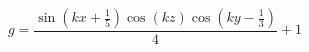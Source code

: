 $$
g = \frac{\sin{\left(k x + \frac{1}{5} \right)} \cos{\left(k z \right)} \cos{\left(k y - \frac{1}{3} \right)}}{4} + 1
$$

